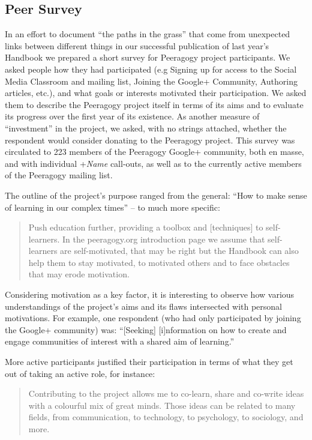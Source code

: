 \documentclass{acm_proc_article-sp}
\begin{document}
\subsection{Peer Survey}

In an effort to document ``the paths in the grass'' \cite{Wall} that come from unexpected links between different things in our successful publication of last year's Handbook we prepared a short survey for Peeragogy project participants. We asked people how they had participated (e.g Signing up for access to the Social Media Classroom and mailing list, Joining the Google+ Community, Authoring articles, etc.), and what goals or interests motivated their participation. We asked them to describe the Peeragogy project itself in terms of its aims and to evaluate its progress over the first year of its existence. As another measure of ``investment'' in the project, we asked, with no strings attached, whether the respondent would consider donating to the Peeragogy project. This survey was circulated to 223 members of the Peeragogy Google+ community, both en masse, and with individual +{\sl Name} call-outs, as well as to the currently active members of the Peeragogy mailing list.

The outline of the project's purpose ranged from the general: ``How to
make sense of learning in our complex times'' -- to much more
specific:

\begin{quote}
Push education further, providing a toolbox and [techniques] to
self-learners. In the peeragogy.org introduction page we assume that
self-learners are self-motivated, that may be right but the Handbook
can also help them to stay motivated, to motivated others and to face
obstacles that may erode motivation.
\end{quote}

Considering motivation as a key factor, it is interesting to observe
how various understandings of the project's aims and its flaws
intersected with personal motivations. For example, one respondent
(who had only participated by joining the Google+ community) was:
``[Seeking] [i]nformation on how to create and engage communities of
interest with a shared aim of learning.''

More active participants justified their participation in terms of what they get out of taking an active role, for instance:

\begin{quote}
Contributing to the project allows me to co-learn, share and co-write ideas with a colourful mix of great minds. Those ideas can be related to many fields, from communication, to technology, to psychology, to sociology, and more.
\end{quote}
\end{document}
